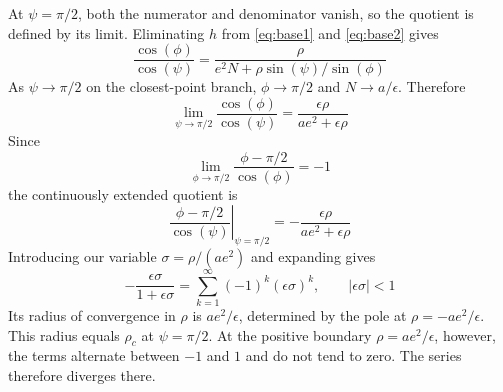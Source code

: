 \documentclass[a4paper]{amsart}
\begin{document}
At $\psi=\pi/2$, both the numerator and denominator vanish, so the quotient is defined by its limit. Eliminating $h$ from \eqref{eq:base1} and \eqref{eq:base2} gives
\begin{equation*}
\frac{\cos(\phi)}{\cos(\psi)}
=
\frac{\rho}
{e^2N+\rho\sin(\psi)/\sin(\phi)}
\end{equation*}
As $\psi\to\pi/2$ on the closest-point branch, $\phi\to\pi/2$ and $N\to a/\epsilon$. Therefore
\begin{equation}\label{eq:coscos_limit}
\lim_{\psi\to\pi/2}\frac{\cos(\phi)}{\cos(\psi)}
=\frac{\epsilon\rho}{ae^2+\epsilon\rho}
\end{equation}
Since
\begin{equation*}
\lim_{\phi\to\pi/2}\frac{\phi-\pi/2}{\cos(\phi)}=-1
\end{equation*}
the continuously extended quotient is
\begin{equation*}
\left.\frac{\phi-\pi/2}{\cos(\psi)}\right|_{\psi=\pi/2}
=-\frac{\epsilon\rho}{ae^2+\epsilon\rho}
\end{equation*}
Introducing our variable $\sigma=\rho/(ae^2)$ and expanding gives
\begin{equation*}
-\frac{\epsilon\sigma}{1+\epsilon\sigma}
=\sum_{k=1}^{\infty}(-1)^k \left(\epsilon\sigma\right)^k,\qquad \left|\epsilon\sigma\right|<1
\end{equation*}
Its radius of convergence in $\rho$ is $ae^2/\epsilon$, determined by the pole at $\rho=-ae^2/\epsilon$. This radius equals $\rho_c$ at $\psi=\pi/2$. At the positive boundary $\rho=ae^2/\epsilon$, however, the terms alternate between $-1$ and $1$ and do not tend to zero. The series therefore diverges there.
\end{document}

